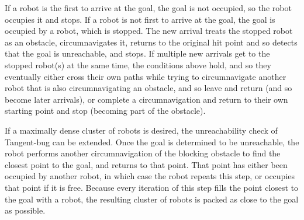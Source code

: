 If a robot is the first to arrive at the goal, the goal is not occupied, so the robot occupies it and stops. 
If a robot is not first to arrive at the goal, the goal is occupied by a robot, which is stopped. 
The new arrival treats the stopped robot as an obstacle, circumnavigates it, returns to the original hit point and so detects that the goal is unreachable, and stops. 
If multiple new arrivals get to the stopped robot(s) at the same time, the conditions above hold, and so they eventually either cross their own paths while trying to circumnavigate another robot that is also circumnavigating an obstacle, and so leave and return (and so become later arrivals), or complete a circumnavigation and return to their own starting point and stop (becoming part of the obstacle).

If a maximally dense cluster of robots is desired, the unreachability check of Tangent-bug can be extended. 
Once the goal is determined to be unreachable, the robot performs another circumnavigation of the blocking obstacle to find the closest point to the goal, and returns to that point. 
That point has either been occupied by another robot, in which case the robot repeats this step, or occupies that point if it is free. 
Because every iteration of this step fills the point closest to the goal with a robot, the resulting cluster of robots is packed as close to the goal as possible. 

